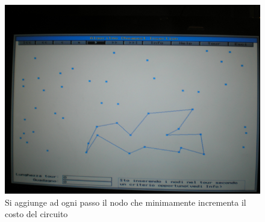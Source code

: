 \documentclass{article}
\begin{document}
\begin{figure}[H]
    \centering
    \includegraphics[scale=0.5]{images/cheap_ins2.png}
    \caption{Si aggiunge ad ogni passo il nodo che minimamente incrementa il costo del circuito}
\end{figure}
\end{document}
